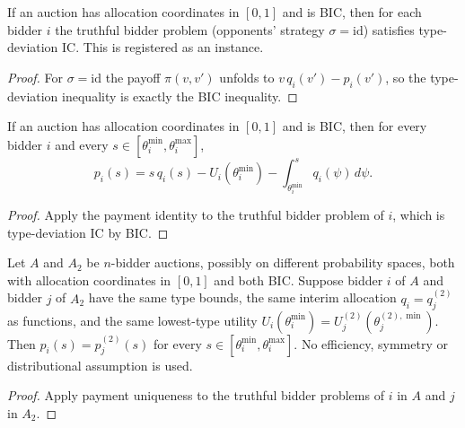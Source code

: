 \begin{lemma}\label{def:MathEconLib.Auction.hasTypeDeviationIC_of_bic}\leanok
{}
If an auction has allocation coordinates in $[0,1]$ and is BIC, then for each bidder $i$ the truthful bidder problem (opponents' strategy $\sigma=\mathrm{id}$) satisfies type-deviation IC. This is registered as an instance.
\end{lemma}
\begin{proof}\leanok
For $\sigma=\mathrm{id}$ the payoff $\pi(v,v')$ unfolds to $v\,q_i(v')-p_i(v')$, so the type-deviation inequality is exactly the BIC inequality.
\end{proof}

\begin{theorem}\label{thm:MathEconLib.Auction.payment_formula}\leanok
{}
If an auction has allocation coordinates in $[0,1]$ and is BIC, then for every bidder $i$ and every $s\in[\theta^{\min}_i,\theta^{\max}_i]$,
\[
p_i(s)=s\,q_i(s)-U_i(\theta^{\min}_i)-\int_{\theta^{\min}_i}^{s}q_i(\psi)\,d\psi.
\]
\end{theorem}
\begin{proof}\leanok
{}
Apply the payment identity to the truthful bidder problem of $i$, which is type-deviation IC by BIC.
\end{proof}

\begin{theorem}\label{thm:MathEconLib.Auction.payment_equivalence}\leanok
{}
Let $A$ and $A_2$ be $n$-bidder auctions, possibly on different probability spaces, both with allocation coordinates in $[0,1]$ and both BIC. Suppose bidder $i$ of $A$ and bidder $j$ of $A_2$ have the same type bounds, the same interim allocation $q_i=q^{(2)}_j$ as functions, and the same lowest-type utility $U_i(\theta^{\min}_i)=U^{(2)}_j(\theta^{(2),\min}_j)$. Then $p_i(s)=p^{(2)}_j(s)$ for every $s\in[\theta^{\min}_i,\theta^{\max}_i]$. No efficiency, symmetry or distributional assumption is used.
\end{theorem}
\begin{proof}\leanok
{}
Apply payment uniqueness to the truthful bidder problems of $i$ in $A$ and $j$ in $A_2$.
\end{proof}

